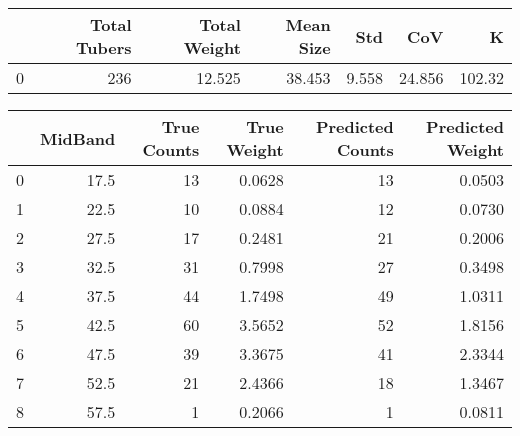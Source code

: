 \begin{tabular}{lrrrrrr}
\toprule
{} &  Total Tubers &  Total Weight &  Mean Size &    Std &     CoV &       K \\
\midrule
0 &           236 &        12.525 &     38.453 &  9.558 &  24.856 &  102.32 \\
\bottomrule
\end{tabular}

\begin{tabular}{lrrrrr}
\toprule
{} &  MidBand &  True Counts &  True Weight &  Predicted Counts &  Predicted Weight \\
\midrule
0 &     17.5 &           13 &       0.0628 &                13 &            0.0503 \\
1 &     22.5 &           10 &       0.0884 &                12 &            0.0730 \\
2 &     27.5 &           17 &       0.2481 &                21 &            0.2006 \\
3 &     32.5 &           31 &       0.7998 &                27 &            0.3498 \\
4 &     37.5 &           44 &       1.7498 &                49 &            1.0311 \\
5 &     42.5 &           60 &       3.5652 &                52 &            1.8156 \\
6 &     47.5 &           39 &       3.3675 &                41 &            2.3344 \\
7 &     52.5 &           21 &       2.4366 &                18 &            1.3467 \\
8 &     57.5 &            1 &       0.2066 &                 1 &            0.0811 \\
\bottomrule
\end{tabular}

